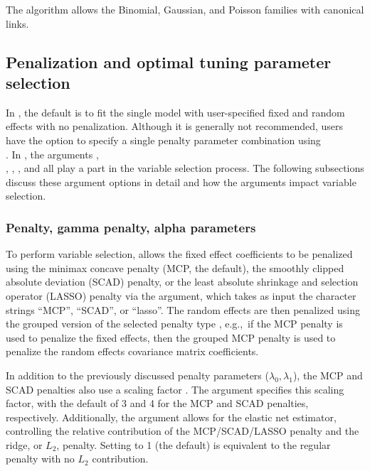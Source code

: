 The  algorithm allows the Binomial, Gaussian, and
Poisson families with canonical links.


\subsection{Penalization and optimal tuning parameter selection}
\label{sec:selection-penalization}

In , the default is to fit the single model with user-specified fixed and random effects with no penalization. Although it is generally not recommended, users have the option to specify a single penalty parameter combination using \\
. In , the arguments , \\
, , , and  all
play a part in the variable selection process. The following subsections
discuss these argument options in detail and how the arguments impact
variable selection.

\subsubsection{Penalty, gamma penalty, alpha
parameters}
\label{sec:penalty-params}

To perform variable selection,  allows the fixed effect coefficients to
be penalized using the minimax concave penalty (MCP, the default), the smoothly clipped absolute deviation (SCAD) penalty, or the least absolute shrinkage and selection operator (LASSO) penalty \citep{ncvreg2011, glmnet2010} via the  argument, which takes as input the character strings ``MCP'', ``SCAD'', or ``lasso''. The random effects are then penalized using the grouped version of the selected penalty type \citep{grpreg2015}, e.g.,~if the MCP penalty is used to penalize the fixed effects, then the grouped MCP penalty is used to penalize the random effects covariance matrix coefficients. 

In addition to the previously discussed penalty parameters ($\lambda_0, \lambda_1$), the MCP and SCAD penalties also use a scaling factor \citep{ncvreg2011, grpreg2015}. The argument 
specifies this scaling factor, with the default of 3 and 4 for the MCP and SCAD penalties, respectively. Additionally, the argument
 allows for the elastic net estimator, controlling the relative
contribution of the MCP/SCAD/LASSO penalty and the ridge, or $L_2$,
penalty. Setting  to 1 (the default) is equivalent to the
regular penalty with no $L_2$ contribution.


